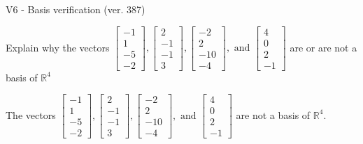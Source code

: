 \begin{exercise}
  \begin{exerciseTitle}V6 - Basis verification (ver. 387)\end{exerciseTitle}
  \begin{exerciseStatement}
    Explain why the vectors \(\left[\begin{array}{r}
-1 \\
1 \\
-5 \\
-2
\end{array}\right] , \left[\begin{array}{r}
2 \\
-1 \\
-1 \\
3
\end{array}\right] , \left[\begin{array}{r}
-2 \\
2 \\
-10 \\
-4
\end{array}\right] , \text{ and } \left[\begin{array}{r}
4 \\
0 \\
2 \\
-1
\end{array}\right]\) are or are not a basis of \(\mathbb{R}^4\)	


  \end{exerciseStatement}
  \begin{exerciseAnswer}
   The vectors \(\left[\begin{array}{r}
-1 \\
1 \\
-5 \\
-2
\end{array}\right] , \left[\begin{array}{r}
2 \\
-1 \\
-1 \\
3
\end{array}\right] , \left[\begin{array}{r}
-2 \\
2 \\
-10 \\
-4
\end{array}\right] , \text{ and } \left[\begin{array}{r}
4 \\
0 \\
2 \\
-1
\end{array}\right]\) 
  	 are not  a basis of \(\mathbb{R}^4\).
  


  \end{exerciseAnswer}
\end{exercise}
